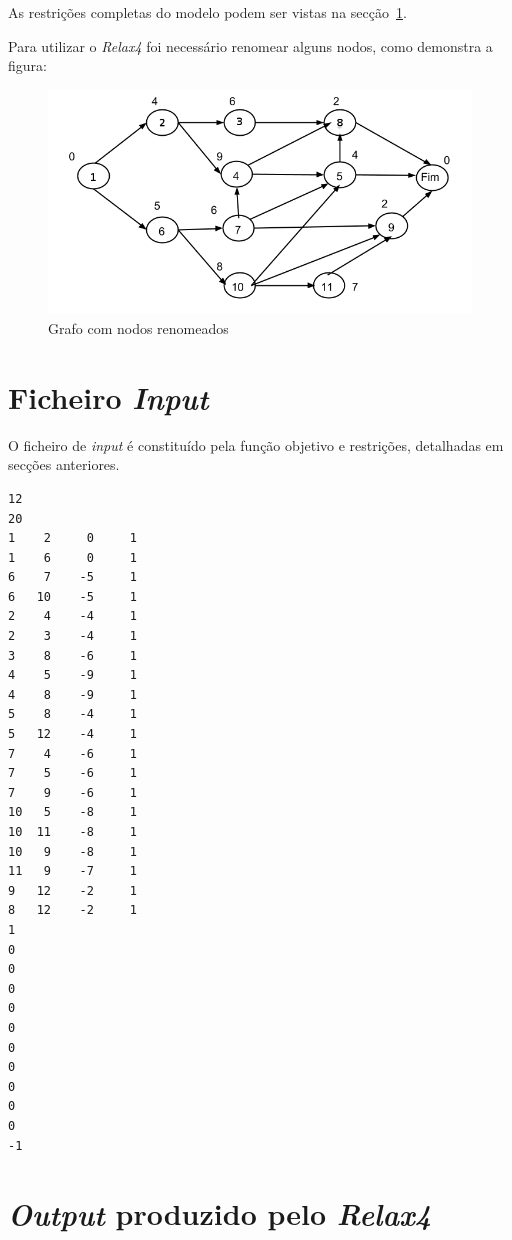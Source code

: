 As restrições completas do modelo podem ser vistas na
secção~\ref{p1:sec:fichin}.

Para utilizar o \emph{Relax4} foi necessário renomear alguns nodos, como
demonstra a figura:

\begin{figure}[<+htpb+>]
	\centering
	  \includegraphics[scale=0.5]{./img/p1_rede_com_duracoes_relax}
	\caption{Grafo com nodos renomeados}
\end{figure}


\section{Ficheiro \emph{Input}}
\label{p1:sec:fichin}
O ficheiro de \emph{input} é constituído pela função objetivo e restrições, detalhadas
em secções anteriores.

\begin{verbatim}
12                   
20                   
1    2     0     1 
1    6     0     1 
6    7    -5     1 
6   10    -5     1 
2    4    -4     1 
2    3    -4     1 
3    8    -6     1 
4    5    -9     1 
4    8    -9     1 
5    8    -4     1 
5   12    -4     1 
7    4    -6     1 
7    5    -6     1 
7    9    -6     1 
10   5    -8     1 
10  11    -8     1 
10   9    -8     1 
11   9    -7     1 
9   12    -2     1 
8   12    -2     1 
1                   
0                    
0                    
0                    
0                    
0                    
0                    
0                    
0                    
0                    
0                    
-1                    

\end{verbatim}

\newpage

\section{\emph{Output} produzido pelo \emph{Relax4}}


